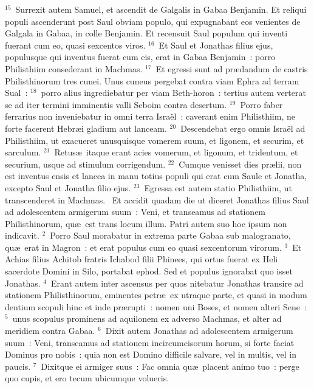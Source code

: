 ${}^{15}$~Surrexit autem Samuel, et ascendit de Galgalis in Gabaa Benjamin. Et reliqui populi ascenderunt post Saul obviam populo, qui expugnabant eos venientes de Galgala in Gabaa, in colle Benjamin. Et recensuit Saul populum qui inventi fuerant cum eo, quasi sexcentos viros.
${}^{16}$~Et Saul et Jonathas filius ejus, populusque qui inventus fuerat cum eis, erat in Gabaa Benjamin~: porro Philisthiim consederant in Machmas.
${}^{17}$~Et egressi sunt ad pr\ae dandum de castris Philisthinorum tres cunei. Unus cuneus pergebat contra viam Ephra ad terram Sual~:
${}^{18}$~porro alius ingrediebatur per viam Beth-horon~: tertius autem verterat se ad iter termini imminentis valli Seboim contra desertum.
${}^{19}$~Porro faber ferrarius non inveniebatur in omni terra Isra\"el~: caverant enim Philisthiim, ne forte facerent Hebr\ae i gladium aut lanceam.
${}^{20}$~Descendebat ergo omnis Isra\"el ad Philisthiim, ut exacueret unusquisque vomerem suum, et ligonem, et securim, et sarculum.
${}^{21}$~Retus\ae\ itaque erant acies vomerum, et ligonum, et tridentum, et securium, usque ad stimulum corrigendum.
${}^{22}$~Cumque venisset dies pr\ae lii, non est inventus ensis et lancea in manu totius populi qui erat cum Saule et Jonatha, excepto Saul et Jonatha filio ejus.
${}^{23}$~Egressa est autem statio Philisthiim, ut transcenderet in Machmas.
~Et accidit quadam die ut diceret Jonathas filius Saul ad adolescentem armigerum suum~: Veni, et transeamus ad stationem Philisthinorum, qu\ae\ est trans locum illum. Patri autem suo hoc ipsum non indicavit.
${}^{2}$~Porro Saul morabatur in extrema parte Gabaa sub malogranato, qu\ae\ erat in Magron~: et erat populus cum eo quasi sexcentorum virorum.
${}^{3}$~Et Achias filius Achitob fratris Ichabod filii Phinees, qui ortus fuerat ex Heli sacerdote Domini in Silo, portabat ephod. Sed et populus ignorabat quo isset Jonathas.
${}^{4}$~Erant autem inter ascensus per quos nitebatur Jonathas transire ad stationem Philisthinorum, eminentes petr\ae\ ex utraque parte, et quasi in modum dentium scopuli hinc et inde pr\ae rupti~: nomen uni Boses, et nomen alteri Sene~:
${}^{5}$~unus scopulus prominens ad aquilonem ex adverso Machmas, et alter ad meridiem contra Gabaa.
${}^{6}$~Dixit autem Jonathas ad adolescentem armigerum suum~: Veni, transeamus ad stationem incircumcisorum horum, si forte faciat Dominus pro nobis~: quia non est Domino difficile salvare, vel in multis, vel in paucis.
${}^{7}$~Dixitque ei armiger suus~: Fac omnia qu\ae\ placent animo tuo~: perge quo cupis, et ero tecum ubicumque volueris.
